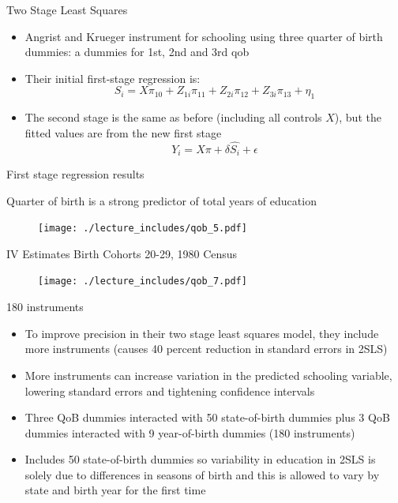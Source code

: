 \documentclass{beamer}
\begin{document}
\begin{frame}{Two Stage Least Squares}
	
	\begin{itemize}
	\item Angrist and Krueger instrument for schooling using three quarter of birth dummies:  a dummies for 1st, 2nd and 3rd qob
	\item Their initial  first-stage regression is:$$S_i=X\pi_{10} + Z_{1i}\pi_{11} + Z_{2i}\pi_{12} + Z_{3i}\pi_{13}+\eta_1$$
	\item The second stage is the same as before (including all controls $X$), but the fitted values are from the new first stage $$Y_i = X \pi + \delta \widehat{S_i} + \epsilon$$
	\end{itemize}

\end{frame}


\begin{frame}{First stage regression results}

	 Quarter of birth is a strong predictor of total years of education
	
	\begin{figure}
	\texttt{[image: ./lecture\_includes/qob\_5.pdf]}
	\end{figure}

\end{frame}




\begin{frame}{IV Estimates Birth Cohorts 20-29, 1980 Census}
	
	\begin{figure}
	\texttt{[image: ./lecture\_includes/qob\_7.pdf]}
	\end{figure}
	
\end{frame}




\begin{frame}{180 instruments}

\begin{itemize}
\item To improve precision in their two stage least squares model, they include more instruments (causes 40 percent reduction in standard errors in 2SLS)
\item More instruments can increase variation in the predicted schooling variable, lowering standard errors and tightening confidence intervals
\item Three QoB dummies interacted with 50 state-of-birth dummies plus 3 QoB dummies interacted with 9 year-of-birth dummies (180 instruments)
\item Includes 50 state-of-birth dummies so variability in education in 2SLS is solely due to differences in seasons of birth and this is allowed to vary by state and birth year for the first time
\end{itemize}

\end{frame}
\end{document}
